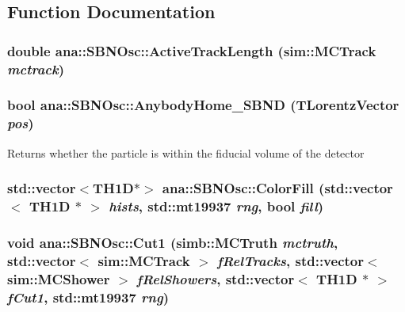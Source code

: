 \subsection{Function Documentation}
\hypertarget{namespaceana_1_1SBNOsc_ac84baa6d3fc6c2bed6b6a28ac055eae4}{
\subsubsection[{ActiveTrackLength}]{\setlength{\rightskip}{0pt plus 5cm}double ana::SBNOsc::ActiveTrackLength (sim::MCTrack {\em mctrack})}}
\label{namespaceana_1_1SBNOsc_ac84baa6d3fc6c2bed6b6a28ac055eae4}
\hypertarget{namespaceana_1_1SBNOsc_a7e1f4b48137c1022518fb8eaaf87c5b6}{
\subsubsection[{AnybodyHome\_\-SBND}]{\setlength{\rightskip}{0pt plus 5cm}bool ana::SBNOsc::AnybodyHome\_\-SBND (TLorentzVector {\em pos})}}
\label{namespaceana_1_1SBNOsc_a7e1f4b48137c1022518fb8eaaf87c5b6}
Returns whether the particle is within the fiducial volume of the detector \hypertarget{namespaceana_1_1SBNOsc_aa40041630409c79b46793f85659e12ff}{
\subsubsection[{ColorFill}]{\setlength{\rightskip}{0pt plus 5cm}std::vector$<$TH1D$\ast$$>$ ana::SBNOsc::ColorFill (std::vector$<$ TH1D $\ast$ $>$ {\em hists}, \/  std::mt19937 {\em rng}, \/  bool {\em fill})}}
\label{namespaceana_1_1SBNOsc_aa40041630409c79b46793f85659e12ff}
\hypertarget{namespaceana_1_1SBNOsc_aee76a04c637ea0eabf24d70fa1fa93fa}{
\subsubsection[{Cut1}]{\setlength{\rightskip}{0pt plus 5cm}void ana::SBNOsc::Cut1 (simb::MCTruth {\em mctruth}, \/  std::vector$<$ sim::MCTrack $>$ {\em fRelTracks}, \/  std::vector$<$ sim::MCShower $>$ {\em fRelShowers}, \/  std::vector$<$ TH1D $\ast$ $>$ {\em fCut1}, \/  std::mt19937 {\em rng})}}

